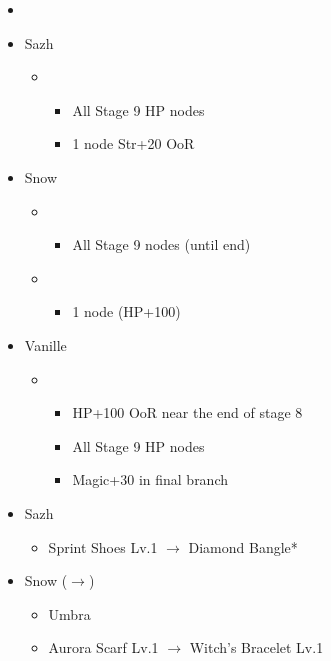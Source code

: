 \begin{menu}
	\begin{itemize}
	\paradigm
		\begin{itemize}
			\item {}%
				{\paradigmline[4]{\com}{\sen}{\med}}%
				{\paradigmline{\sab}{\sen}{\sab}}%
				{\paradigmline{(\sen)}{\sen}{(\med)}}%
				{\paradigmline{\com}{\com}{\sab}}%
				{\paradigmline{\rav}{\sen}{\rav}}%
				{\paradigmline{\rav}{\rav}{\rav}}%
		\end{itemize}
	\crystarium
		\begin{itemize}
			\item Sazh
				\begin{itemize}
					\item \com
						\begin{itemize}
							\item All Stage 9 HP nodes
							\item 1 node Str+20 OoR
						\end{itemize}
				\end{itemize}
			\item Snow
				\begin{itemize}
					\item \rav
						\begin{itemize}
							\item All Stage 9 nodes (until end)
						\end{itemize}
					\item \sen
						\begin{itemize}
							\item 1 node (HP+100)
						\end{itemize}
				\end{itemize}
			\item Vanille
				\begin{itemize}
					\item \rav
						\begin{itemize}
							\item HP+100 OoR near the end of stage 8
							\item All Stage 9 HP nodes
							\item Magic+30 in final branch
						\end{itemize}
				\end{itemize}								
		\end{itemize}
	\equip
		\begin{itemize}
			\item Sazh
				\begin{itemize}
					\item Sprint Shoes Lv.1 $\rightarrow$ Diamond Bangle*
				\end{itemize}
			\item Snow ($\rightarrow$)
				\begin{itemize}
					\item Umbra
					\item Aurora Scarf Lv.1 $\rightarrow$ Witch's Bracelet Lv.1
				\end{itemize}
		\end{itemize}
	\end{itemize}
\end{menu}

